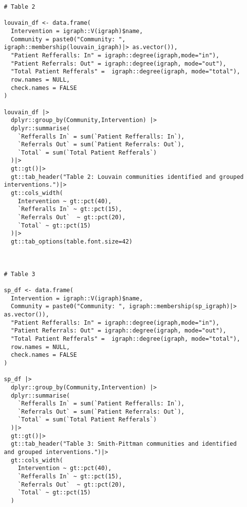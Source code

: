 \begin{verbatim}
# Table 2

louvain_df <- data.frame(
  Intervention = igraph::V(igraph)$name,
  Community = paste0("Community: ", igraph::membership(louvain_igraph)|> as.vector()),
  "Patient Refferalls: In" = igraph::degree(igraph,mode="in"),
  "Patient Referrals: Out" = igraph::degree(igraph, mode="out"),
  "Total Patient Refferals" =  igraph::degree(igraph, mode="total"),
  row.names = NULL,
  check.names = FALSE
)

louvain_df |>
  dplyr::group_by(Community,Intervention) |> 
  dplyr::summarise(
    `Refferalls In` = sum(`Patient Refferalls: In`),
    `Referrals Out` = sum(`Patient Referrals: Out`),
    `Total` = sum(`Total Patient Refferals`)
  )|>
  gt::gt()|>
  gt::tab_header("Table 2: Louvain communities identified and grouped interventions.")|>
  gt::cols_width(
    Intervention ~ gt::pct(40),
    `Refferalls In` ~ gt::pct(15),
    `Referrals Out`  ~ gt::pct(20),
    `Total` ~ gt::pct(15)
  )|>
  gt::tab_options(table.font.size=42)



# Table 3

sp_df <- data.frame(
  Intervention = igraph::V(igraph)$name,
  Community = paste0("Community: ", igraph::membership(sp_igraph)|> as.vector()),
  "Patient Refferalls: In" = igraph::degree(igraph,mode="in"),
  "Patient Referrals: Out" = igraph::degree(igraph, mode="out"),
  "Total Patient Refferals" =  igraph::degree(igraph, mode="total"),
  row.names = NULL,
  check.names = FALSE
)

sp_df |>
  dplyr::group_by(Community,Intervention) |> 
  dplyr::summarise(
    `Refferalls In` = sum(`Patient Refferalls: In`),
    `Referrals Out` = sum(`Patient Referrals: Out`),
    `Total` = sum(`Total Patient Refferals`)
  )|>
  gt::gt()|>
  gt::tab_header("Table 3: Smith-Pittman communities and identified and grouped interventions.")|>
  gt::cols_width(
    Intervention ~ gt::pct(40),
    `Refferalls In` ~ gt::pct(15),
    `Referrals Out`  ~ gt::pct(20),
    `Total` ~ gt::pct(15)
  )
\end{verbatim}

